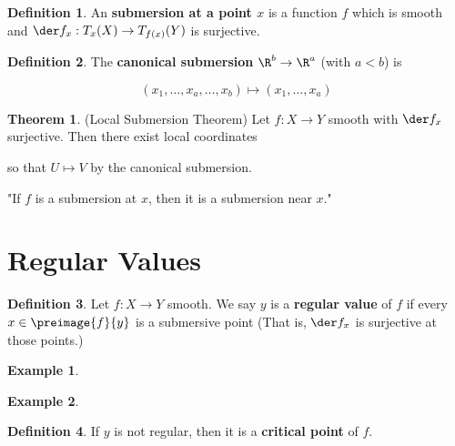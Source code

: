 \documentclass[a5paper]{article}
\theoremstyle{definition}%
\newtheorem{theorem}{Theorem}
\newtheorem*{definition*}{Definition}
\newtheorem*{example*}{Example}
\numberwithin{exercise}{section}
\theoremstyle{remark}%
\renewcommand{\emph}{\textbf}
\begin{document}
\begin{definition*}
An \emph{submersion at a point $x$} is a function $f$ which is smooth and $\der	f_x:T_x(X)\to T_{f(x)}(Y)$ is surjective. 
\end{definition*}

\begin{definition*}
The \emph{canonical submersion} $\R^b\to \R^a$ (with $a<b$) is 

$$(x_1, \dots, x_a, \dots, x_b) \mapsto (x_1, \dots, x_a)$$
\end{definition*}

\begin{highlight}
\begin{theorem}(Local Submersion Theorem)
Let $f:X\to Y$ smooth with $\der f_x$ surjective. 
%
%
Then there exist local coordinates 


so that $U\mapsto V$ by the canonical submersion. %

"If $f$ is a submersion at $x$, then it is a submersion near $x$."
\end{theorem}
\end{highlight}

\section{Regular Values}

\begin{highlight}
\begin{definition*}
Let $f:X\to Y$ smooth. We say $y$ is a \emph{regular value} of $f$ if every $x\in \preimage{f}{y}$ is a submersive point (That is, $\der f_x$ is surjective at those points.)
\end{definition*}
\end{highlight}

\begin{example*}\mbox{}
\end{example*}

\begin{example*}\mbox{}
\end{example*}

\begin{definition*}
If $y$ is not regular, then it is a \emph{critical point} of $f$. 
\end{definition*}
\end{document}
